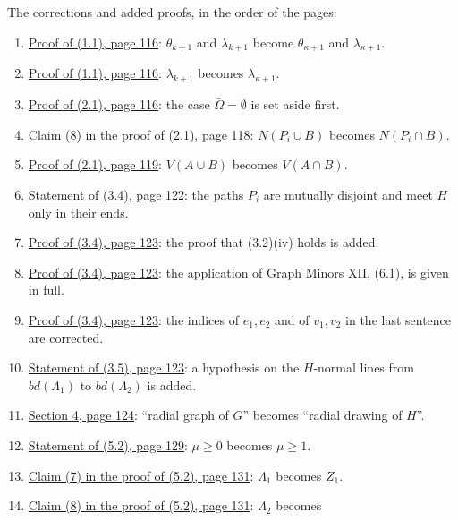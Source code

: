 The corrections and added proofs, in the order of the pages:
\begin{enumerate}\setlength{\itemsep}{1pt}
\item {}\hyperref[fix:1.1-proof-theta]{Proof of (1.1), page 116}: $\theta_{k+1}$ and
$\lambda_{k+1}$ become $\theta_{\kappa+1}$ and $\lambda_{\kappa+1}$.
\item {}\hyperref[fix:1.1-proof-lambda]{Proof of (1.1), page 116}: $\lambda_{k+1}$ becomes
$\lambda_{\kappa+1}$.
\item {}\hyperref[fix:2.1-proof-empty]{Proof of (2.1), page 116}: the case
$\bar{\Omega} = \emptyset$ is set aside first.
\item {}\hyperref[fix:2.1-claim8]{Claim (8) in the proof of (2.1), page 118}:
$N(P_i \cup B)$ becomes $N(P_i \cap B)$.
\item {}\hyperref[fix:2.1-proof-R]{Proof of (2.1), page 119}: $V(A \cup B)$ becomes
$V(A \cap B)$.
\item {}\hyperref[fix:3.4]{Statement of (3.4), page 122}: the paths $P_i$ are mutually disjoint
and meet $H$ only in their ends.
\item {}\hyperref[fix:3.4-iv-step-added]{Proof of (3.4), page 123}: the proof that (3.2)(iv)
holds is added.
\item {}\hyperref[fix:3.4-6.1-step-added]{Proof of (3.4), page 123}: the application of Graph
Minors XII, (6.1), is given in full.
\item {}\hyperref[fix:3.4-proof-indices]{Proof of (3.4), page 123}: the indices of $e_1, e_2$ and
of $v_1, v_2$ in the last sentence are corrected.
\item {}\hyperref[fix:3.5]{Statement of (3.5), page 123}: a hypothesis on the $H$-normal lines
from $bd(\Lambda_1)$ to $bd(\Lambda_2)$ is added.
\item {}\hyperref[fix:4-ins]{Section 4, page 124}: ``radial graph of $G$'' becomes ``radial
drawing of $H$''.
\item {}\hyperref[fix:5.2]{Statement of (5.2), page 129}: $\mu \ge 0$ becomes $\mu \ge 1$.
\item {}\hyperref[fix:5.2-claim7]{Claim (7) in the proof of (5.2), page 131}: $\Lambda_1$ becomes
$Z_1$.
\item {}\hyperref[fix:5.2-claim8]{Claim (8) in the proof of (5.2), page 131}: $\Lambda_2$ becomes

\end{enumerate}
